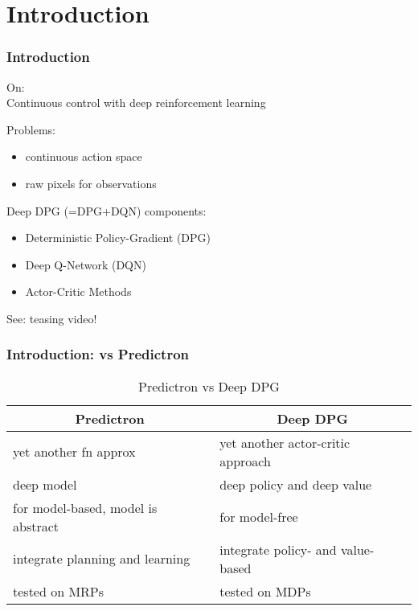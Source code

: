 \section{Introduction}

\begin{frame}
\frametitle{Introduction}
On:\\
Continuous control with deep reinforcement learning~\cite{Lillicrap2015}
\vspace{3mm}

Problems:
\begin{itemize}
  \item continuous action space
  \item raw pixels for observations
\end{itemize}
\vspace{3mm}

Deep DPG (=DPG+DQN) components:
\begin{itemize}
  \item Deterministic Policy-Gradient (DPG) \cite{Silver2014}
  \item Deep Q-Network (DQN) \cite{Mnih2013}
  \item Actor-Critic Methods \cite{Sutton1998}
\end{itemize}
\vspace{5mm}

See: teasing video!
\end{frame}

\begin{frame}
\frametitle{Introduction: vs Predictron \cite{Silver2016}}

\begin{table}[]
\centering
\caption{Predictron vs Deep DPG}
\label{my-label}
\begin{tabular}{|l|l|}
\hline
\multicolumn{1}{|c|}{\textbf{Predictron}} & \multicolumn{1}{c|}{\textbf{Deep DPG}} \\ \hline
yet another fn approx          & yet another actor-critic approach \\ \hline
deep model          & deep policy and deep value                \\ \hline
for model-based, model is abstract & for model-free                \\ \hline
integrate planning and learning & integrate policy- and value-based \\ \hline
tested on MRPs                  & tested on MDPs                \\ \hline
\end{tabular}
\end{table}

\end{frame}

